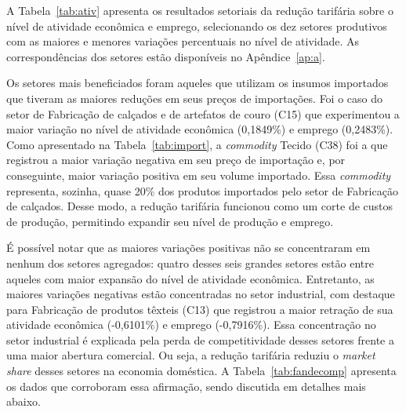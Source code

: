 A Tabela~\ref{tab:ativ} apresenta os resultados setoriais da redução tarifária sobre o nível de atividade econômica e emprego, selecionando os dez setores produtivos com as maiores e menores variações percentuais no nível de atividade. As correspondências dos setores estão disponíveis no Apêndice~\ref{ap:a}.

Os setores mais beneficiados foram aqueles que utilizam os insumos importados que tiveram as maiores reduções em seus preços de importações. Foi o caso do setor de Fabricação de calçados e de artefatos de couro (C15) que experimentou a maior variação no nível de atividade econômica (0,1849\%) e emprego (0,2483\%). Como apresentado na Tabela~\ref{tab:import}, a \textit{commodity} Tecido (C38) foi a que registrou a maior variação negativa em seu preço de importação e, por conseguinte, maior variação positiva em seu volume importado. Essa \textit{commodity} representa, sozinha, quase 20\% dos produtos importados pelo setor de Fabricação de calçados. Desse modo, a redução tarifária funcionou como um corte de custos de produção, permitindo expandir seu nível de produção e emprego.

É possível notar que as maiores variações positivas não se concentraram em nenhum dos setores agregados: quatro desses seis grandes setores estão entre aqueles com maior expansão do nível de atividade econômica. Entretanto, as maiores variações negativas estão concentradas no setor industrial, com destaque para Fabricação de produtos têxteis (C13) que registrou a maior retração de sua atividade econômica (-0,6101\%) e emprego (-0,7916\%). Essa concentração no setor industrial é explicada pela perda de competitividade desses setores frente a uma maior abertura comercial. Ou seja, a redução tarifária reduziu o \textit{market share} desses setores na economia doméstica. A Tabela~\ref{tab:fandecomp} apresenta os dados que corroboram essa afirmação, sendo discutida em detalhes mais abaixo.


